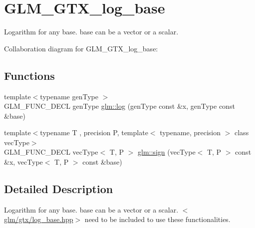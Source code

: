 \hypertarget{group__gtx__log__base}{\section{G\-L\-M\-\_\-\-G\-T\-X\-\_\-log\-\_\-base}
\label{group__gtx__log__base}
}


Logarithm for any base. base can be a vector or a scalar.  


Collaboration diagram for G\-L\-M\-\_\-\-G\-T\-X\-\_\-log\-\_\-base\-:
\subsection*{Functions}
\begin{DoxyCompactItemize}
\item 
{\footnotesize template$<$typename gen\-Type $>$ }\\G\-L\-M\-\_\-\-F\-U\-N\-C\-\_\-\-D\-E\-C\-L gen\-Type \hyperlink{group__gtx__log__base_ga60a7b0a401da660869946b2b77c710c9}{glm\-::log} (gen\-Type const \&x, gen\-Type const \&base)
\item 
{\footnotesize template$<$typename T , precision P, template$<$ typename, precision $>$ class vec\-Type$>$ }\\G\-L\-M\-\_\-\-F\-U\-N\-C\-\_\-\-D\-E\-C\-L vec\-Type$<$ T, P $>$ \hyperlink{group__gtx__log__base_ga1842004a127a9f3573764362ff639191}{glm\-::sign} (vec\-Type$<$ T, P $>$ const \&x, vec\-Type$<$ T, P $>$ const \&base)
\end{DoxyCompactItemize}


\subsection{Detailed Description}
Logarithm for any base. base can be a vector or a scalar. $<$\hyperlink{log__base_8hpp}{glm/gtx/log\-\_\-base.\-hpp}$>$ need to be included to use these functionalities. 

